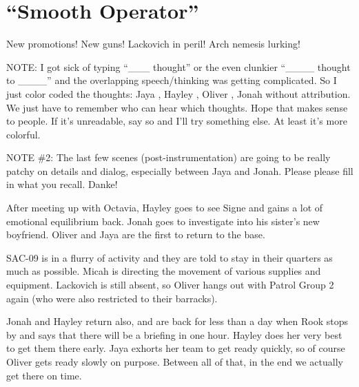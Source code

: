\setcounter{chapter}{ 19 }
\chapter{\textbf{``Smooth Operator''} }








New promotions!  New guns!  Lackovich in peril!  Arch nemesis lurking!



NOTE: I got sick of typing ``\_\_\_ thought'' or the even clunkier ``\_\_\_\_ thought to \_\_\_\_'' and the overlapping speech/thinking was getting complicated.  So I just color coded the thoughts:  {\color[RGB]{204,0,0}Jaya} ,  {\color[RGB]{230,145,56}Hayley} ,  {\color[RGB]{106,168,79}Oliver} ,  {\color[RGB]{60,120,216}Jonah}  without attribution.  We just have to remember who can hear which thoughts.  Hope that makes sense to people.  If it's unreadable, say so and I'll try something else.  At least it's more colorful.



NOTE \#2: The last few scenes (post-instrumentation) are going to be really patchy on details and dialog, especially between Jaya and Jonah.  Please please fill in what you recall.  Danke!



\noindent\hrulefill





After meeting up with Octavia, Hayley goes to see Signe and gains a lot of emotional equilibrium back.  Jonah goes to investigate into his sister's new boyfriend.  Oliver and Jaya are the first to return to the base.



SAC-09 is in a flurry of activity and they are told to stay in their quarters as much as possible.  Micah is directing the movement of various supplies and equipment.  Lackovich is still absent, so Oliver hangs out with Patrol Group 2 again (who were also restricted to their barracks).



Jonah and Hayley return also, and are back for less than a day when Rook stops by and says that there will be a briefing in one hour.  Hayley does her very best to get them there early.   Jaya exhorts her team to get ready quickly, so of course Oliver gets ready slowly on purpose.   Between all of that, in the end we actually get there on time.



